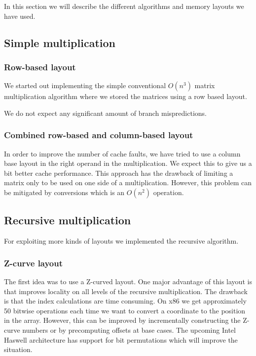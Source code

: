 In this section we will describe the different algorithms and memory
layouts we have used.

\subsection{Simple multiplication}

\subsubsection{Row-based layout}
We started out implementing the simple conventional $O(n^3)$ matrix
multiplication algorithm where we stored the matrices using a row
based layout.


We do not expect any significant amount of branch mispredictions.

\subsubsection{Combined row-based and column-based layout}

In order to improve the number of cache faults, we have tried to use a
column base layout in the right operand in the multiplication. We
expect this to give us a bit better cache performance. This approach
has the drawback of limiting a matrix only to be used on one side of a
multiplication. However, this problem can be mitigated by conversions which is an $O(n^2)$ operation.

\subsection{Recursive multiplication}

For exploiting more kinds of layouts we implemented the recursive algorithm.

\subsubsection{Z-curve layout}

The first idea was to use a Z-curved layout. One major advantage of this layout is that improves locality on all levels of the recursive multiplication. The drawback is that the index calculations are time consuming. On x86 we get approximately 50 bitwise operations each time we want to convert a coordinate to the position in the array. However, this can be improved by incrementally constructing the Z-curve numbers or by precomputing offsets at base cases. The upcoming Intel Haswell architecture has support for bit permutations which will improve the situation.


